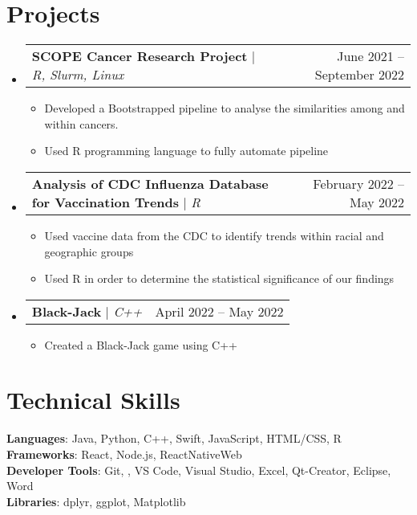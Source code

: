 \documentclass[letterpaper,11pt]{article}
\makeatletter
\newcommand{\resumeItem}[1]{
  \item\small{
    {#1 \vspace{-2pt}}
  }
}
\newcommand{\resumeProjectHeading}[2]{
    \item
    \begin{tabular*}{0.97\textwidth}{l@{\extracolsep{\fill}}r}
      \small#1 & #2 \\
    \end{tabular*}\vspace{-7pt}
}
\newcommand{\resumeSubHeadingListStart}{\begin{itemize}[leftmargin=0.15in, label={}]}
\newcommand{\resumeSubHeadingListEnd}{\end{itemize}}
\newcommand{\resumeItemListStart}{\begin{itemize}}
\newcommand{\resumeItemListEnd}{\end{itemize}\vspace{-5pt}}
\makeatother
\begin{document}
\section{Projects}
    \resumeSubHeadingListStart
      \resumeProjectHeading
          {\textbf{SCOPE Cancer Research Project} $|$ \emph{R, Slurm, Linux}}{June 2021 --  September 2022}
          \resumeItemListStart
            \resumeItem{Developed a Bootstrapped pipeline to analyse the similarities among and within cancers.}
            \resumeItem{Used R programming language to fully automate pipeline}
          \resumeItemListEnd
      \resumeProjectHeading
          {\textbf{Analysis of CDC Influenza Database for Vaccination Trends} $|$ \emph{R}}{February 2022 -- May 2022}
          \resumeItemListStart
            \resumeItem{Used vaccine data from the CDC to identify trends within racial and geographic groups}
            \resumeItem{Used R in order to determine the statistical significance of our findings}
          \resumeItemListEnd
          \resumeProjectHeading
          {\textbf{Black-Jack} $|$ \emph{C++}}{April 2022 -- May 2022}
          \resumeItemListStart
            \resumeItem{Created a Black-Jack game using C++}
          \resumeItemListEnd
    \resumeSubHeadingListEnd

%
\section{Technical Skills}
 \begin{itemize}[leftmargin=0.15in, label={}]
    \small{\item{
     \textbf{Languages}{: Java, Python, C++, Swift, JavaScript, HTML/CSS, R} \\
     \textbf{Frameworks}{: React, Node.js, ReactNativeWeb} \\
     \textbf{Developer Tools}{: Git, , VS Code, Visual Studio, Excel, Qt-Creator, Eclipse, Word} \\
     \textbf{Libraries}{: dplyr, ggplot, Matplotlib}
    }}
 \end{itemize}
%

\end{document}
